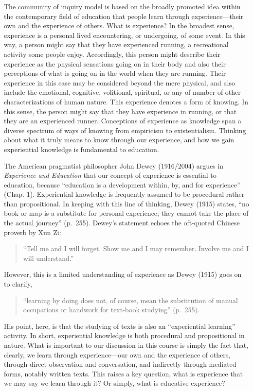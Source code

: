 \documentclass[
]{book}
\begin{document}
The community of inquiry model is based on the broadly promoted idea within the contemporary field of education that people learn through experience---their own and the experience of others. What is experience? In the broadest sense, experience is a personal lived encountering, or undergoing, of some event. In this way, a person might say that they have experienced running, a recreational activity some people enjoy. Accordingly, this person might describe their experience as the physical sensations going on in their body and also their perceptions of what is going on in the world when they are running. Their experience in this case may be considered beyond the mere physical, and also include the emotional, cognitive, volitional, spiritual, or any of number of other characterizations of human nature. This experience denotes a form of knowing. In this sense, the person might say that they have experience in running, or that they are an experienced runner. Conceptions of experience as knowledge span a diverse spectrum of ways of knowing from empiricism to existentialism. Thinking about what it truly means to know through our experience, and how we gain experiential knowledge is fundamental to education.

The American pragmatist philosopher John Dewey (1916/2004) argues in \emph{Experience and Education} that our concept of experience is essential to education, because ``education is a development within, by, and for experience'' (Chap. 1). Experiential knowledge is frequently assumed to be procedural rather than propositional. In keeping with this line of thinking, Dewey (1915) states, ``no book or map is a substitute for personal experience; they cannot take the place of the actual journey'' (p.~255). Dewey's statement echoes the oft-quoted Chinese proverb by Xun Zi:

\begin{quote}
``Tell me and I will forget. Show me and I may remember. Involve me and I will understand.''
\end{quote}

However, this is a limited understanding of experience as Dewey (1915) goes on to clarify,

\begin{quote}
``learning by doing does not, of course, mean the substitution of manual occupations or handwork for text-book studying'' (p.~255).
\end{quote}

His point, here, is that the studying of texts is also an ``experiential learning'' activity. In short, experiential knowledge is both procedural and propositional in nature. What is important to our discussion in this course is simply the fact that, clearly, we learn through experience---our own and the experience of others, through direct observation and conversation, and indirectly through mediated forms, notably written texts. This raises a key question, what is experience that we may say we learn through it? Or simply, what is educative experience?
\end{document}
